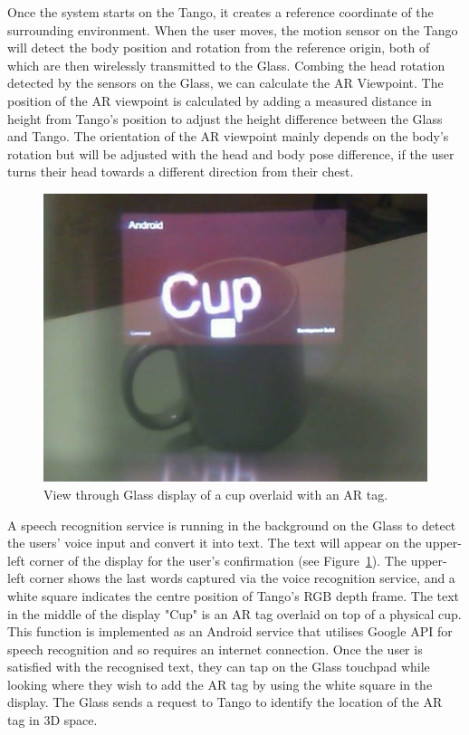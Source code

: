 Once the system starts on the Tango, it creates a reference coordinate of the surrounding environment. When the user moves, the motion sensor on the Tango will detect the body position and rotation from the reference origin, both of which are then wirelessly transmitted to the Glass. Combing the head rotation detected by the sensors on the Glass, we can calculate the AR Viewpoint. The position of the AR viewpoint is calculated by adding a measured distance in height from Tango's position to adjust the height difference between the Glass and Tango. The orientation of the AR viewpoint mainly depends on the body's rotation but will be adjusted with the head and body pose difference, if the user turns their head towards a different direction from their chest. 

\begin{figure}[ht]
  \centering
  \includegraphics[width=.8\linewidth]{images/mgia15/WIN_20150614_204531_2.jpg}
  \caption{View through Glass display of a cup overlaid with an AR tag.}
  \label{fig:mgia15:ui}
\end{figure}

A speech recognition service is running in the background on the Glass to detect the users' voice input and convert it into text. The text will appear on the upper-left corner of the display for the user's confirmation (see Figure~\ref{fig:mgia15:ui}). The upper-left corner shows the last words captured via the voice recognition service, and a white square indicates the centre position of Tango's RGB depth frame. The text in the middle of the display "Cup" is an AR tag overlaid on top of a physical cup. This function is implemented as an Android service that utilises Google API for speech recognition and so requires an internet connection. Once the user is satisfied with the recognised text, they can tap on the Glass touchpad while looking where they wish to add the AR tag by using the white square in the display. The Glass sends a request to Tango to identify the location of the AR tag in 3D space.

